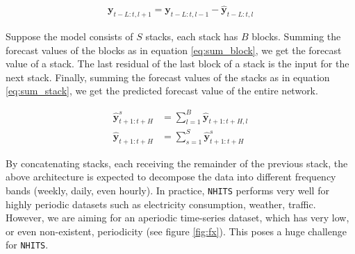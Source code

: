 \documentclass[aps,prb,groupedaddress,twocolumn,showpacs,dvipdfmx,superscriptaddress,pdftex]{revtex4-2}
\begin{document}
\begin{align}
    \mathbf{y}_{t-L:t, l+1} = \mathbf{y}_{t-L:t, l-1} - \mathbf{\hat{y}}_{t-L:t, l}
    \label{eq:input_l1}
\end{align}


Suppose the model consists of $S$ stacks, each stack has $B$ blocks. Summing the forecast values of the blocks as in equation \ref{eq:sum_block}, we get the forecast value of a stack. The last residual of the last block of a stack is the input for the next stack. Finally, summing the forecast values of the stacks as in equation \ref{eq:sum_stack}, we get the predicted forecast value of the entire network.

\begin{align}
    \mathbf{\hat{y}}_{t+1:t+H}^s &= \sum_{l=1}^{B}{\mathbf{\hat{y}}_{t+1:t+H, l}} \label{eq:sum_block}\\
    \mathbf{\hat{y}}_{t+1:t+H} &= \sum_{s=1}^{S}{\mathbf{\hat{y}}_{t+1:t+H}^s} \label{eq:sum_stack}
\end{align}


By concatenating stacks, each receiving the remainder of the previous stack, the above architecture is expected to decompose the data into different frequency bands (weekly, daily, even hourly). In practice, \verb|NHITS| performs very well for highly periodic datasets such as electricity consumption, weather, traffic. However, we are aiming for an aperiodic time-series dataset, which has very low, or even non-existent, periodicity (see figure \ref{fig:fx}). This poses a huge challenge for \verb|NHITS|.
\end{document}
